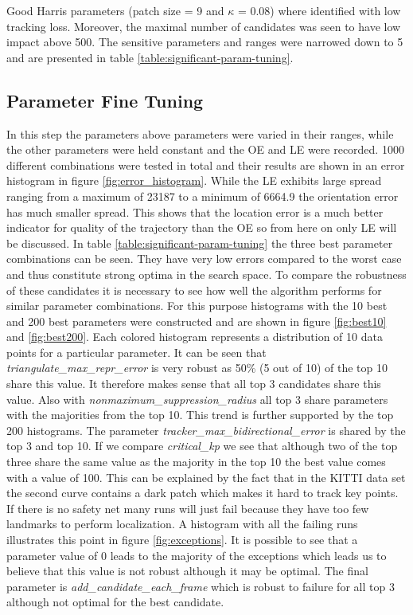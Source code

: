 \medskip

Good Harris parameters (patch size = 9 and $\kappa$ =  0.08) where identified with low tracking loss. 
Moreover, the maximal number of candidates was seen to have low impact above 500. 
The sensitive parameters and ranges were narrowed down to 5 and are presented in table \ref{table:significant-param-tuning}.

\subsection{Parameter Fine Tuning}  

In this step the parameters above parameters were varied in their ranges, while the other parameters were held constant and the OE and LE were recorded. 
1000 different combinations were tested in total and their results are shown in an error histogram in figure \ref{fig:error_histogram}. 
While the LE exhibits large spread ranging from a maximum of 23187 to a minimum of 6664.9 the orientation error has much smaller spread. 
This shows that the location error is a much better indicator for quality of the trajectory than the OE so from here on only LE will be discussed.
In table \ref{table:significant-param-tuning} the three best parameter combinations can be seen. 
They have very low errors compared to the worst case and thus constitute strong optima in the search space.
To compare the robustness of these candidates it is necessary to see how well the algorithm performs for similar parameter combinations. 
For this purpose histograms with the 10 best and 200 best parameters were constructed and are shown in figure \ref{fig:best10} and \ref{fig:best200}. 
Each colored histogram represents a distribution of 10 data points for a particular parameter. 
It can be seen that \emph{triangulate\_max\_repr\_error} is very robust as 50\% (5 out of 10) of the top 10 share this value. 
It therefore makes sense that all top 3 candidates share this value. 
Also with \emph{nonmaximum\_suppression\_radius} all top 3 share parameters with the majorities from the top 10. 
This trend is further supported by the top 200 histograms.
The parameter \emph{tracker\_max\_bidirectional\_error} is shared by the top 3 and top 10. 
If we compare \emph{critical\_kp} we see that although two of the top three share the same value as the majority in the top 10 the best value comes with a value of 100.
This can be explained by the fact that in the KITTI data set the second curve contains a dark patch which makes it hard to track key points. 
If there is no safety net many runs will just fail because they have too few landmarks to perform localization. 
A histogram with all the failing runs illustrates this point in figure  \ref{fig:exceptions}. 
It is possible to see that a parameter value of 0 leads to the majority of the exceptions which leads us to believe that this value is not robust although it may be optimal. 
The final parameter is \emph{add\_candidate\_each\_frame} which is robust to failure for all top 3 although not optimal for the best candidate.

